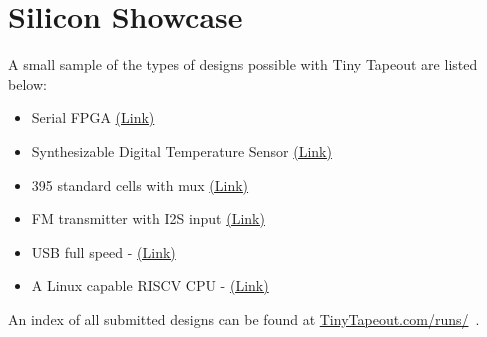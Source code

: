 \section{Silicon Showcase}
\label{sec:silicon_showcase}

A small sample of the types of designs possible with Tiny Tapeout are listed below:

\begin{itemize}
    \item Serial FPGA \href{https://tinytapeout.com/runs/tt02/006/}{(Link)}
    \item Synthesizable Digital Temperature Sensor \href{https://tinytapeout.com/runs/tt03/047/}{(Link)}
    \item 395 standard cells with mux \href{https://tinytapeout.com/runs/tt03/045/}{(Link)}
    \item FM transmitter with I2S input \href{https://tinytapeout.com/runs/tt04/195/}{(Link)}
    \item USB full speed - \href{https://tinytapeout.com/runs/tt04/054/}{(Link)}
    \item A Linux capable RISCV CPU - \href{https://tinytapeout.com/runs/tt05/654/}{(Link)}
\end{itemize}

An index of all submitted designs can be found at \url{TinyTapeout.com/runs/}~\cite{tinytapeoutruns}.
